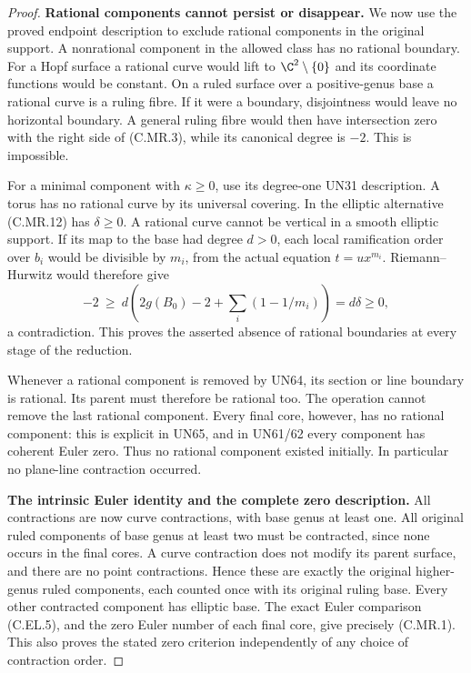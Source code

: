 \begin{proof}
\par\medskip\noindent\textbf{Rational components cannot persist or disappear.}
We now use the proved endpoint
description to exclude rational
components in the original
support. A nonrational
component in the allowed class
has no rational boundary.
For a Hopf surface a rational
curve would lift to
$\C^2\setminus\{0\}$ and its
coordinate functions would be
constant. On a ruled surface
over a positive-genus base a
rational curve is a ruling
fibre. If it were a boundary,
disjointness would leave no
horizontal boundary. A general
ruling fibre would then have
intersection zero with the
right side of (C.MR.3), while
its canonical degree is $-2$.
This is impossible.

For a minimal component with
$\kappa\ge0$, use its degree-one
UN31 description. A torus has
no rational curve by its
universal covering. In the
elliptic alternative (C.MR.12)
has $\delta\ge0$. A rational
curve cannot be vertical in
a smooth elliptic support.
If its map to the base had
degree $d>0$, each local
ramification order over $b_i$
would be divisible by $m_i$,
from the actual equation
$t=u x^{m_i}$. Riemann--Hurwitz
would therefore give
\[
 -2\ \ge\
 d\left(2g(B_0)-2+
              \sum_i(1-1/m_i)\right)
                              =d\delta\ge0,
\tag{C.MR.15}
\]
a contradiction. This proves
the asserted absence of
rational boundaries at every
stage of the reduction.

Whenever a rational component
is removed by UN64, its
section or line boundary is
rational. Its parent must
therefore be rational too.
The operation cannot remove
the last rational component.
Every final core, however,
has no rational component:
this is explicit in UN65,
and in UN61/62 every
component has coherent
Euler zero. Thus no rational
component existed initially.
In particular no plane-line
contraction occurred.

\par\medskip\noindent\textbf{The intrinsic Euler identity and the complete zero description.}
All contractions are now
curve contractions, with
base genus at least one.
All original ruled components
of base genus at least two
must be contracted, since
none occurs in the final
cores. A curve contraction
does not modify its parent
surface, and there are no
point contractions. Hence
these are exactly the
original higher-genus ruled
components, each counted once
with its original ruling base.
Every other contracted
component has elliptic base.
The exact Euler comparison
(C.EL.5), and the zero Euler
number of each final core,
give precisely (C.MR.1).
This also proves the stated
zero criterion independently
of any choice of contraction
order.


\end{proof}
